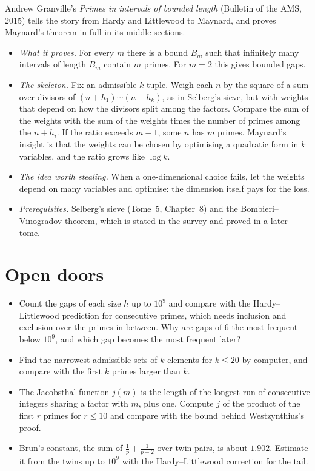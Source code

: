 Andrew Granville's \emph{Primes in intervals of bounded length} (Bulletin of the AMS, 2015) tells the story from Hardy and Littlewood to Maynard, and
proves Maynard's theorem in full in its middle sections.
\begin{itemize}
\item \emph{What it proves.} For every $m$ there is a bound $B_m$ such that infinitely many intervals of length $B_m$ contain $m$ primes. For $m=2$ this
gives bounded gaps.
\item \emph{The skeleton.} Fix an admissible $k$-tuple. Weigh each $n$ by the square of a sum over divisors of $(n+h_1)\cdots(n+h_k)$, as in Selberg's sieve,
but with weights that depend on how the divisors split among the factors. Compare the sum of the weights with the sum of the weights times the number
of primes among the $n+h_i$. If the ratio exceeds $m-1$, some $n$ has $m$ primes. Maynard's insight is that the weights can be chosen by optimising a
quadratic form in $k$ variables, and the ratio grows like $\log k$.
\item \emph{The idea worth stealing.} When a one-dimensional choice fails, let the weights depend on many variables and optimise: the dimension itself
pays for the loss.
\item \emph{Prerequisites.} Selberg's sieve (Tome~5, Chapter~8) and the Bombieri--\allowbreak Vinogradov theorem, which is stated in the survey and proved in a
later tome.
\end{itemize}

\section{Open doors}

\begin{itemize}
\item Count the gaps of each size $h$ up to $10^9$ and compare with the Hardy--Littlewood prediction for consecutive primes, which needs inclusion and
exclusion over the primes in between. Why are gaps of $6$ the most frequent below $10^{9}$, and which gap becomes the most frequent later?
\item Find the narrowest admissible sets of $k$ elements for $k\le20$ by computer, and compare with the first $k$ primes larger than $k$.
\item The Jacobsthal function $j(m)$ is the length of the longest run of consecutive integers sharing a factor with $m$, plus one. Compute $j$ of the
product of the first $r$ primes for $r\le10$ and compare with the bound behind Westzynthius's proof.
\item Brun's constant, the sum of $\frac1p+\frac1{p+2}$ over twin pairs, is about $1.902$. Estimate it from the twins up to $10^9$ with the
Hardy--Littlewood correction for the tail.
\end{itemize}

